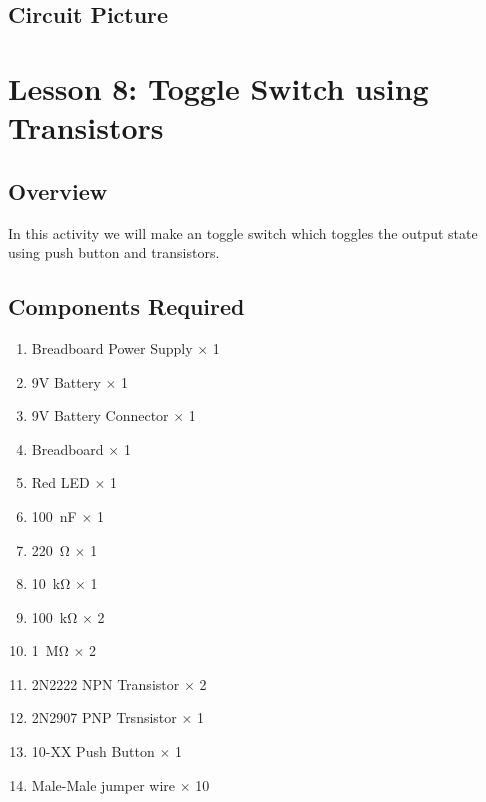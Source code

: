 \subsection{Circuit Picture}




\section{Lesson 8: Toggle Switch using Transistors}
\subsection{Overview}
In this activity we will make an toggle switch which toggles the output state using push button and transistors.
\subsection{Components Required}
\begin{enumerate}
    \item Breadboard Power Supply $\times$ 1
    \item 9V Battery $\times$ 1
    \item 9V Battery Connector $\times$ 1
    \item Breadboard $\times$ 1
    \item Red LED $\times$ 1
    \item \SI{100}{\nano\farad} $\times$ 1
    \item \SI{220}{\ohm} $\times$ 1
    \item \SI{10}{\kilo\ohm} $\times$ 1
    \item \SI{100}{\kilo\ohm} $\times$ 2
    \item \SI{1}{\mega\ohm} $\times$ 2
    \item 2N2222 NPN Transistor $\times$ 2
    \item 2N2907 PNP Trsnsistor $\times$ 1
    \item 10-XX Push Button $\times$ 1
    \item Male-Male jumper wire $\times$ 10
\end{enumerate}
